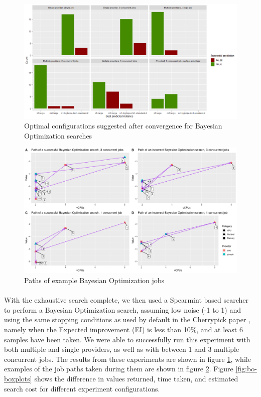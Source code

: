 \documentclass{article}
\begin{document}
\begin{figure}
  \caption{Optimal configurations suggested after convergence for Bayesian Optimization searches}
  \label{fig:bo-results}
  \centering
  \includegraphics[scale=0.5]{bo_results}
\end{figure}
\begin{figure}
	\centering
	\includegraphics[scale=0.4]{paths}
	\caption{Paths of example Bayesian Optimization jobs}
	\label{fig:paths}
\end{figure}

\paragraph{}
With the exhaustive search complete, we then used a Spearmint based searcher to perform a Bayesian Optimization search, assuming low noise (-1 to 1) and using the same stopping conditions as used by default in the Cherrypick paper \cite{Alipourfard2017}, namely when the Expected improvement (EI) is less than 10\%, and at least 6 samples have been taken. We were able to successfully run this experiment with both multiple and single providers, as well as with between 1 and 3 multiple concurrent jobs. The results from these experiments are shown in figure \ref{fig:bo-results}, while examples of the job paths taken during them are shown in figure \ref{fig:paths}. Figure \ref{fig:bo-boxplots} shows the difference in values returned, time taken, and estimated search cost for different experiment configurations.
\end{document}
